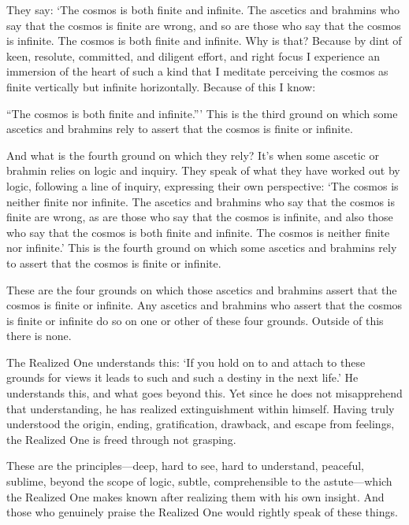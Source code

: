 \documentclass[12pt,openany]{book}%
\begin{document}
They say: ‘The cosmos is both finite and infinite. The ascetics and brahmins who say that the cosmos is finite are wrong, and so are those who say that the cosmos is infinite. The cosmos is both finite and infinite. Why is that? Because by dint of keen, resolute, committed, and diligent effort, and right focus I experience an immersion of the heart of such a kind that I meditate perceiving the cosmos as finite vertically but infinite horizontally. Because of this I know: 

“The cosmos is both finite and infinite.”’ This is the third ground on which some ascetics and brahmins rely to assert that the cosmos is finite or infinite. 

And what is the fourth ground on which they rely? It’s when some ascetic or brahmin relies on logic and inquiry. They speak of what they have worked out by logic, following a line of inquiry, expressing their own perspective: ‘The cosmos is neither finite nor infinite. The ascetics and brahmins who say that the cosmos is finite are wrong, as are those who say that the cosmos is infinite, and also those who say that the cosmos is both finite and infinite. The cosmos is neither finite nor infinite.’ This is the fourth ground on which some ascetics and brahmins rely to assert that the cosmos is finite or infinite. 

These are the four grounds on which those ascetics and brahmins assert that the cosmos is finite or infinite. Any ascetics and brahmins who assert that the cosmos is finite or infinite do so on one or other of these four grounds. Outside of this there is none. 

The Realized One understands this: ‘If you hold on to and attach to these grounds for views it leads to such and such a destiny in the next life.’ He understands this, and what goes beyond this. Yet since he does not misapprehend that understanding, he has realized extinguishment within himself. Having truly understood the origin, ending, gratification, drawback, and escape from feelings, the Realized One is freed through not grasping. 

These are the principles—deep, hard to see, hard to understand, peaceful, sublime, beyond the scope of logic, subtle, comprehensible to the astute—which the Realized One makes known after realizing them with his own insight. And those who genuinely praise the Realized One would rightly speak of these things. 
\end{document}
